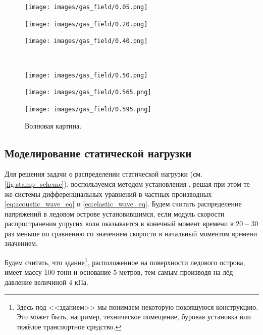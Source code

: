 \begin{figure}[!htb]
    \centering
    \begin{minipage}[b]{.3\textwidth}
        \centering
        \texttt{[image: images/gas\_field/0.05.png]}
    \end{minipage}
    \begin{minipage}[b]{.3\textwidth}
        \centering
        \texttt{[image: images/gas\_field/0.20.png]}
    \end{minipage}
    \begin{minipage}[b]{.3\textwidth}
        \centering
        \texttt{[image: images/gas\_field/0.40.png]}
    \end{minipage}\\
    \begin{minipage}[b]{.3\textwidth}
        \centering
        \texttt{[image: images/gas\_field/0.50.png]}
    \end{minipage}
    \begin{minipage}[b]{.3\textwidth}
        \centering
        \texttt{[image: images/gas\_field/0.565.png]}
    \end{minipage}
    \begin{minipage}[b]{.3\textwidth}
        \centering
        \texttt{[image: images/gas\_field/0.595.png]}
    \end{minipage}
    \caption{Волновая картина.}
    \label{fig:wave_image}
\end{figure}

\subsection{Моделирование статической нагрузки}

Для решения задачи о распределении статической нагрузки (см. \autoref{fig:stamp_scheme}), воспользуемся методом установления \cite{fedorenko_relaxation}, решая при этом те же системы дифференциальных уравнений в частных производных \eqref{eq:acoustic_wave_eq} и \eqref{eq:elastic_wave_eq}. Будем считать распределение напряжений в ледовом острове установившимся, если модуль скорости распространения упругих волн оказывается в конечный момент времени в 20 -- 30 раз меньше по сравнению со значением скорости в  начальный моментом времени значением.

Будем считать, что здание\footnote{Здесь под <<зданием>> мы понимаем некоторую покоящуюся конструкцию. Это может быть, например, техническое помещение, буровая установка или тяжёлое транспортное средство.}, расположенное на поверхности ледового острова, имеет массу 100 тонн и основание 5 метров, тем самым производя на лёд давление величиной 4 кПа.

